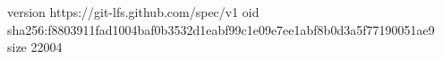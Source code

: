 version https://git-lfs.github.com/spec/v1
oid sha256:f8803911fad1004baf0b3532d1eabf99c1e09e7ee1abf8b0d3a5f77190051ae9
size 22004
